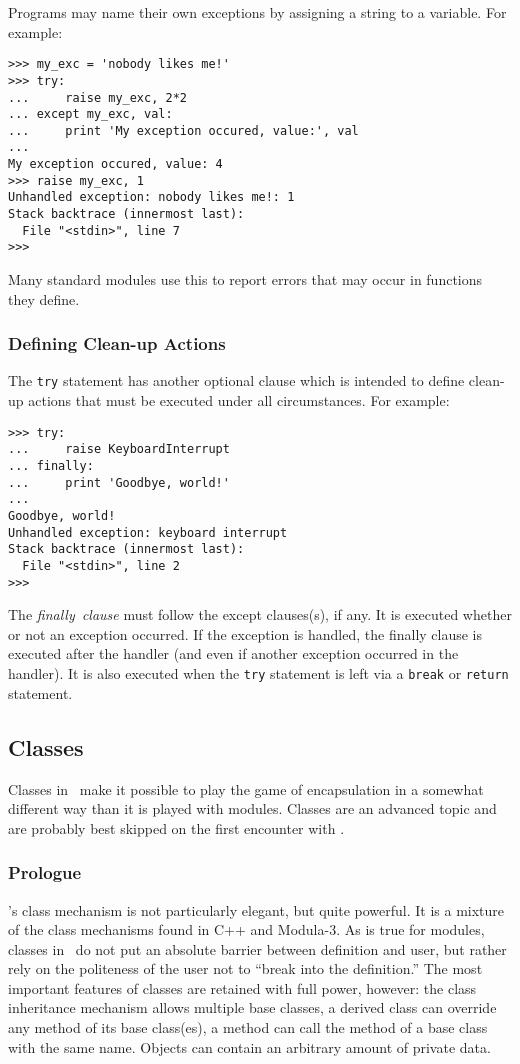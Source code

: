 Programs may name their own exceptions by assigning a string to a
variable.
For example:
\bcode\begin{verbatim}
>>> my_exc = 'nobody likes me!'
>>> try:
...     raise my_exc, 2*2
... except my_exc, val:
...     print 'My exception occured, value:', val
... 
My exception occured, value: 4
>>> raise my_exc, 1
Unhandled exception: nobody likes me!: 1
Stack backtrace (innermost last):
  File "<stdin>", line 7
>>> 
\end{verbatim}\ecode
Many standard modules use this to report errors that may occur in
functions they define.

\subsubsection{Defining Clean-up Actions}

The {\tt try} statement has another optional clause which is intended to
define clean-up actions that must be executed under all circumstances.
For example:
\bcode\begin{verbatim}
>>> try:
...     raise KeyboardInterrupt
... finally:
...     print 'Goodbye, world!'
... 
Goodbye, world!
Unhandled exception: keyboard interrupt
Stack backtrace (innermost last):
  File "<stdin>", line 2
>>> 
\end{verbatim}\ecode
The
{\em finally\ clause}
must follow the except clauses(s), if any.
It is executed whether or not an exception occurred.
If the exception is handled, the finally clause is executed after the
handler (and even if another exception occurred in the handler).
It is also executed when the {\tt try} statement is left via a
{\tt break} or {\tt return} statement.

\subsection{Classes}

Classes in \Python\ make it possible to play the game of encapsulation in a
somewhat different way than it is played with modules.
Classes are an advanced topic and are probably best skipped on the first
encounter with \Python.

\subsubsection{Prologue}

\Python's class mechanism is not particularly elegant, but quite powerful.
It is a mixture of the class mechanisms found in C++ and Modula-3.
As is true for modules, classes in \Python\ do not put an absolute barrier
between definition and user, but rather rely on the politeness of the
user not to ``break into the definition.''
The most important features of classes are retained with full power,
however: the class inheritance mechanism allows multiple base classes,
a derived class can override any method of its base class(es), a method
can call the method of a base class with the same name.
Objects can contain an arbitrary amount of private data.


